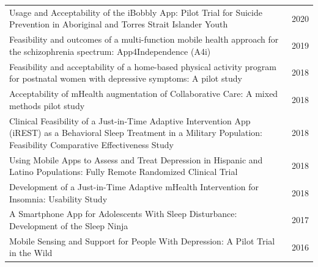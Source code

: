 \begin{longtable}{@{}p{} r@{}}
Usage and Acceptability of the iBobbly App: Pilot Trial for Suicide Prevention in Aboriginal and Torres Strait Islander Youth~\cite{tighe2020ibobbly} & 2020 \\
Feasibility and outcomes of a multi-function mobile health approach for the schizophrenia spectrum: App4Independence (A4i)~\cite{kidd2019app4independence} & 2019 \\
Feasibility and acceptability of a home-based physical activity program for postnatal women with depressive symptoms: A pilot study~\cite{teychenne2018postnatalactivity} & 2018 \\
Acceptability of mHealth augmentation of Collaborative Care: A mixed methods pilot study~\cite{bauer2018mhealthcollaborative} & 2018 \\
Clinical Feasibility of a Just-in-Time Adaptive Intervention App (iREST) as a Behavioral Sleep Treatment in a Military Population: Feasibility Comparative Effectiveness Study~\cite{pulantara2018irest} & 2018 \\
Using Mobile Apps to Assess and Treat Depression in Hispanic and Latino Populations: Fully Remote Randomized Clinical Trial~\cite{pratap2018hispanic} & 2018 \\
Development of a Just-in-Time Adaptive mHealth Intervention for Insomnia: Usability Study~\cite{pulantara2018insomnia} & 2018 \\
A Smartphone App for Adolescents With Sleep Disturbance: Development of the Sleep Ninja~\cite{werner-seidler2017sleepninja} & 2017 \\
Mobile Sensing and Support for People With Depression: A Pilot Trial in the Wild~\cite{wahle2016mobilesensing} & 2016 \\
\end{longtable}
